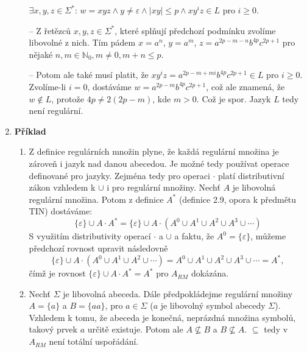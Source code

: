 \documentclass[a4paper,12pt]{article}
\begin{document}
\begin{enumerate}[label=\textbf{\arabic*}.]
\begin{itemize}
    $\exists x,y,z\in \Sigma^*$: $w = xyz \wedge y\neq\varepsilon \wedge |xy|\leq p\wedge xy^iz\in L $ pro $i\geq 0$.
    \item[--] Z řetězců $x,y,z\in\Sigma^*$, které splňují 
    předchozí podmínku zvolíme libovolné z nich. 
    Tím pádem $x = a^n$, $y = a^m$, $z = a^{2p-m-n}b^{4p}c^{2p+1}$ pro nějaké $n, m\in\mathbb{N}_0, m\neq 0, m + n \leq p$.
    \item[--] Potom ale také musí platit, že
    $xy^iz =a^{2p - m + mi}b^{4p}c^{2p+1} \in L$ pro $i\geq 0$. Zvolíme-li $i = 0$, dostáváme $w = a^{2p - m}b^{4p}c^{2p+1}$, což ale znamená, že $w\notin L$, 
    protože $4p \neq 2(2p - m)$, kde $m > 0$. Což je spor. Jazyk $L$ tedy není regulární.
  \end{itemize}
 \item {\bfseries Příklad}
  \begin{enumerate}
   \item Z definice regulárních množin plyne, že každá regulární množina je zároveň i jazyk nad danou abecedou.
    Je možné tedy používat operace definované pro jazyky. Zejména tedy pro operaci $\cdot$ platí distributivní zákon vzhledem k $\cup$ i pro regulární množiny. 
    Nechť $A$ je libovolná regulární množina. Potom z definice $A^*$ (definice 2.9, opora k předmětu TIN) dostáváme:
    $$
      \{\varepsilon\}\cup A\cdot A^* = \{\varepsilon\}\cup A\cdot(A^0 \cup A^1\cup A^2\cup A^3\cup \cdots)
    $$
    S využitím distributivity operací $\cdot$ a $\cup$ a faktu, že $A^0 = \{\varepsilon\}$, můžeme předchozí rovnost upravit následovně
    $$
      \{\varepsilon\}\cup A\cdot(A^0 \cup A^1\cup A^2\cup \cdots) = A^0\cup A^1 \cup A^2\cup A^3\cup \cdots = A^*,
    $$
    čímž je rovnost $\{\varepsilon\}\cup A\cdot A^* = A^*$ pro $A_{RM}$ dokázána.
    
    \item Nechť $\Sigma$ je libovolná abeceda. Dále předpokládejme regulární množiny $A = \{a\}$ a $B = \{ aa\}$, pro $a \in\Sigma$ ($a$ je libovolný symbol abecedy $\Sigma$). Vzhledem
    k tomu, že abeceda je konečná, neprázdná množina symbolů, takový prvek $a$ určitě existuje.
    Potom ale $A\not\subseteq B$ a $B\not\subseteq A$. $\subseteq$ tedy v $A_{RM}$ není totální uspořádání.
  \end{enumerate}

\end{enumerate}
\end{document}
